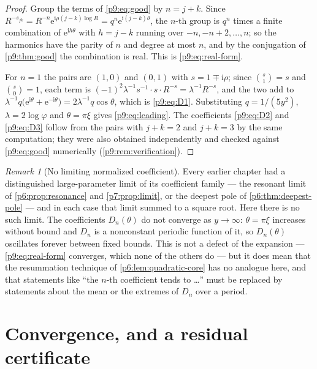 \documentclass[11pt,a4paper,oneside]{book}
\theoremstyle{plain}
\theoremstyle{definition}
\theoremstyle{remark}
\newtheorem{remark}[theorem]{Remark}
\newcommand{\e}{\mathrm{e}}
\newcommand{\ii}{\mathrm{i}}
\begin{document}
\begin{proof}
Group the terms of \eqref{p9:eq:good} by $n=j+k$.  Since
$R^{-s_{jk}}=R^{-n}\e^{\ii\rho(j-k)\log R}=q^{n}\e^{\ii(j-k)\theta}$, the
$n$-th group is $q^{n}$ times a finite combination of $\e^{\ii h\theta}$ with
$h=j-k$ running over $-n,-n+2,\dots,n$; so the harmonics have the parity of
$n$ and degree at most $n$, and by the conjugation of
\cref{p9:thm:good} the combination is real.  This is
\eqref{p9:eq:real-form}.

For $n=1$ the pairs are $(1,0)$ and $(0,1)$ with $s=1\mp\ii\rho$; since
$\binom s1=s$ and $\binom s0=1$, each term is
$(-1)^{2}\lambda^{-1}s^{-1}\cdot s\cdot R^{-s}=\lambda^{-1}R^{-s}$, and the
two add to
$\lambda^{-1}q\bigl(\e^{\ii\theta}+\e^{-\ii\theta}\bigr)
=2\lambda^{-1}q\cos\theta$, which is \eqref{p9:eq:D1}.  Substituting
$q=1/(5y^{2})$, $\lambda=2\log\varphi$ and $\theta=\pi\xi$ gives
\eqref{p9:eq:leading}.  The coefficients \eqref{p9:eq:D2} and
\eqref{p9:eq:D3} follow from the pairs with $j+k=2$ and $j+k=3$ by the same
computation; they were also obtained independently and checked against
\eqref{p9:eq:good} numerically (\cref{p9:rem:verification}).
\end{proof}

\begin{remark}[No limiting normalized coefficient]\label{p9:rem:no-limit}
Every earlier chapter had a distinguished large-parameter limit of its
coefficient family --- the resonant limit of \cref{p6:prop:resonance} and
\cref{p7:prop:limit}, or the deepest pole of \cref{p6:thm:deepest-pole} ---
and in each case that limit summed to a square root.  Here there is no such
limit.  The coefficients $D_n(\theta)$ do not converge as $y\to\infty$:
$\theta=\pi\xi$ increases without bound and $D_n$ is a nonconstant periodic
function of it, so $D_n(\theta)$ oscillates forever between fixed bounds.
This is not a defect of the expansion --- \eqref{p9:eq:real-form} converges,
which none of the others do --- but it does mean that the resummation
technique of \cref{p6:lem:quadratic-core} has no analogue here, and that
statements like ``the $n$-th coefficient tends to \dots'' must be replaced by
statements about the mean or the extremes of $D_n$ over a period.
\end{remark}

\section{Convergence, and a residual certificate}
\label{p9:sec:convergence}
\end{document}
